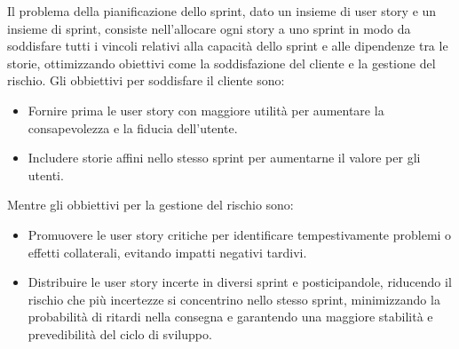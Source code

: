 \documentclass[12pt,a4paper,openright,twoside]{book}
\begin{document}
\vspace{1em}


Il problema della pianificazione dello sprint, dato un insieme di user story e un insieme di sprint, consiste nell'allocare ogni story a uno sprint in modo da soddisfare tutti i vincoli relativi alla capacità dello sprint e alle dipendenze tra le storie, ottimizzando obiettivi come la soddisfazione del cliente e la gestione del rischio.
Gli obbiettivi per soddisfare il cliente sono:

\begin{itemize}
    \item Fornire prima le user story con maggiore utilità per aumentare la consapevolezza e la fiducia dell'utente.
    \item Includere storie affini nello stesso sprint per aumentarne il valore per gli utenti.
\end{itemize}

Mentre gli obbiettivi per la gestione del rischio sono:

\begin{itemize}
    \item Promuovere le user story critiche per identificare tempestivamente problemi o effetti collaterali, evitando impatti negativi tardivi.
    \item Distribuire le user story incerte in diversi sprint e posticipandole, riducendo il rischio che più incertezze si concentrino nello stesso sprint, minimizzando la probabilità di ritardi nella consegna e garantendo una maggiore stabilità e prevedibilità del ciclo di sviluppo.
\end{itemize}
\end{document}
